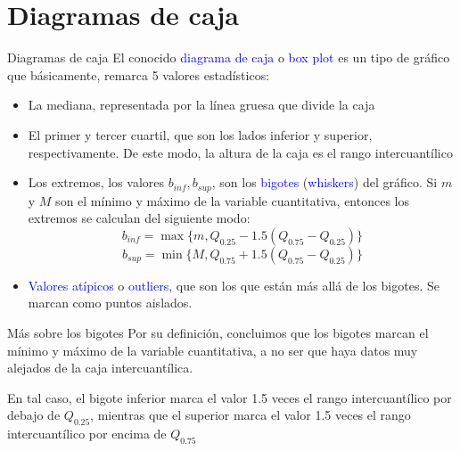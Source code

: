 \documentclass[
  ignorenonframetext,
]{beamer}
\providecommand{\tightlist}{%
  \setlength{\itemsep}{0pt}\setlength{\parskip}{0pt}}
\newcommand\blue[1]{\textcolor{blue}{#1}}
\begin{document}
\section{Diagramas de caja}\label{diagramas-de-caja}

\begin{frame}{Diagramas de caja}
\label{diagramas-de-caja-1}
El conocido \blue{diagrama de caja} o \blue{box plot} es un tipo de
gráfico que básicamente, remarca 5 valores estadísticos:

\begin{itemize}
\tightlist
\item
  La mediana, representada por la línea gruesa que divide la caja
\item
  El primer y tercer cuartil, que son los lados inferior y superior,
  respectivamente. De este modo, la altura de la caja es el rango
  intercuantílico
\item
  Los extremos, los valores \(b_{inf},b_{sup}\), son los \blue{bigotes}
  (\blue{whiskers}) del gráfico. Si \(m\) y \(M\) son el mínimo y máximo
  de la variable cuantitativa, entonces los extremos se calculan del
  siguiente modo: \[b_{inf}=\max\{m,Q_{0.25}-1.5(Q_{0.75}-Q_{0.25})\}\]
  \[b_{sup}=\min\{M,Q_{0.75}+1.5(Q_{0.75}-Q_{0.25})\}\]
\item
  \blue{Valores atípicos} o \blue{outliers}, que son los que están más
  allá de los bigotes. Se marcan como puntos aislados.
\end{itemize}
\end{frame}

\begin{frame}{Más sobre los bigotes}
\label{muxe1s-sobre-los-bigotes}
Por su definición, concluimos que los bigotes marcan el mínimo y máximo
de la variable cuantitativa, a no ser que haya datos muy alejados de la
caja intercuantílica.

En tal caso, el bigote inferior marca el valor 1.5 veces el rango
intercuantílico por debajo de \(Q_{0.25}\), mientras que el superior
marca el valor 1.5 veces el rango intercuantílico por encima de
\(Q_{0.75}\)
\end{frame}
\end{document}
